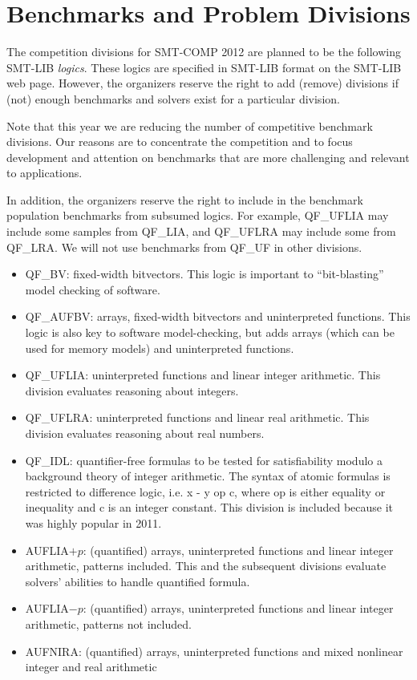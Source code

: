 \documentclass[12pt]{article}
\begin{document}
\section{Benchmarks and Problem Divisions}
\label{sec:theories}


The competition divisions for SMT-COMP 2012 are planned to be the following
SMT-LIB \emph{logics}.  These logics are specified in SMT-LIB format on the
SMT-LIB web page.  However, the organizers reserve the right to add
(remove) divisions if (not) enough benchmarks and solvers exist for a
particular division.

Note that this year we are reducing the number of competitive benchmark divisions.
Our reasons are to concentrate the competition and to focus development and attention
on benchmarks that are more challenging and relevant to applications.

In addition, the organizers reserve the right to include in the benchmark population benchmarks
from subsumed logics. For example, QF\_UFLIA may include some samples from QF\_LIA, and QF\_UFLRA may include some from QF\_LRA.
We will not use benchmarks from QF\_UF in other divisions.

\begin{itemize}

\item QF\_BV: fixed-width bitvectors. This logic is important to ``bit-blasting'' model checking of software.
\item QF\_AUFBV: arrays, fixed-width bitvectors and uninterpreted
functions. This logic is also key to software model-checking, but adds arrays (which can be used for memory models) and uninterpreted functions.

\item QF\_UFLIA: uninterpreted functions and linear integer arithmetic. This division evaluates reasoning about integers.
\item QF\_UFLRA: uninterpreted functions and linear real arithmetic. This division evaluates reasoning about real numbers.

\item QF\_IDL: quantifier-free formulas to be
  tested for satisfiability modulo a background theory of integer
  arithmetic.  The syntax of atomic formulas is restricted to
  difference logic, i.e. x - y op c, where op is either equality or
  inequality and c is an integer constant. This division is included because it was highly popular in 2011.

\item AUFLIA$+p$: (quantified) arrays, uninterpreted functions and 
linear integer arithmetic, patterns included. This and the subsequent divisions evaluate solvers' abilities to handle quantified formula.
\item AUFLIA$-p$: (quantified) arrays, uninterpreted functions and 
linear integer arithmetic, patterns not included.
\item AUFNIRA: (quantified) arrays, uninterpreted functions and 
mixed nonlinear integer and real arithmetic

\end{itemize}
\end{document}
